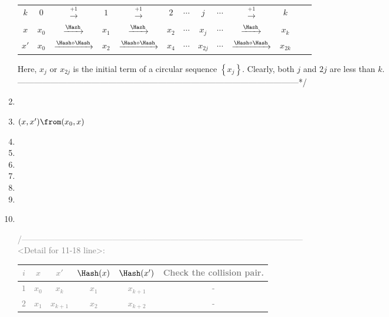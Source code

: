 \documentclass[12pt,openany]{book}
\newcommand{\set}[1]{\left\{#1\right\}}
\begin{document}
\begin{tcolorbox}[title=\textbf{Algorithm.}\ Small-Space Attack, coltitle=black, colback=white,colframe=-red, breakable, enhanced]
\begin{enumerate}[$1$:]
{\begin{center}
\begin{tabular}{c|||c||c||c||c||c||c||c||c||c||c||c||c}
						\midrule
						$k$ & $0$ &$\xrightarrow{+1}$ & $1$ &$\xrightarrow{+1}$& $2$ & $\cdots$& $j$& $\cdots$&$\xrightarrow{+1}$& $k$\\
						$x$ & $x_0$ &$\xrightarrow{\Hash}$& $x_1$ &$\xrightarrow{\Hash}$& $x_2$&  $\cdots$& $x_j$& $\cdots$&$\xrightarrow{\Hash}$&$x_k$\\
						$x'$ & $x_0$ &$\xrightarrow{\Hash\circ\Hash}$& $x_2$ &$\xrightarrow{\Hash\circ\Hash}$& $x_4$& $\cdots$& $x_{2j}$& $\cdots$&$\xrightarrow{\Hash\circ\Hash}$& $x_{2k}$\\
						\bottomrule[1.5pt]
					\end{tabular}
				\end{center} Here, $x_j$ or $x_{2j}$ is the initial term of a circular sequence $\set{x_j}$. Clearly, both $j$ and $2j$ are less than $k$.
				\\ ------------------------------------------------------------------------------------------------------*\slash}
			\item[]
			\textcolor{gray}{}
			\item $(x,x')\from(x_0,x)$\quad \textcolor{gray}{}
			\item {}
			\item \qquad{}
			\item \qquad\qquad{}
			\item \qquad{}
			\item \qquad\qquad{$(x,x')\from\left(\Hash(x),\Hash(x')\right)$}
			\item \qquad{}
			\item {}\\
			\newpage
			\textcolor{gray}{\slash*------------------------------------------------------------------------------------------------------\\
				<Detail for 11-18 line>: \begin{center}
					\begin{tabular}{c||cc|cc||c}
						\toprule[1.5pt]
						$i$ & $x$ & $x'$&$\Hash(x)$& $\Hash(x')$ & Check the collision pair.\\
						\midrule
						$1$& $x_0$& $x_k$ &$x_1$&$x_{k+1}$&-\\
						\hline
						$2$& $x_1$& $x_{k+1}$ &$x_2$&$x_{k+2}$&-\\
						\hline

\end{tabular}
\end{center}}
\end{enumerate}
\end{tcolorbox}
\end{document}

